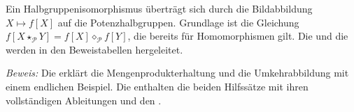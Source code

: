 \par{}
\hypertarget{power-isomorphisms.notation}{}
Ein Halbgruppenisomorphismus überträgt sich durch die Bildabbildung
\(X\mapsto f[X]\) auf die Potenzhalbgruppen. Grundlage ist die Gleichung
\(f[X\star_{\mathcal P}Y]=f[X]\diamond_{\mathcal P}f[Y]\), die bereits
für Homomorphismen gilt. Die
und die
werden in den Beweistabellen hergeleitet.

\setcounter{formulaThm}{3}
\hypertarget{power-isomorphisms.main.isomorphism}{}
\PowerIsoIsomorphismStatement

\noindent\emph{Beweis:} Die \PowerIsoReadingLink{} erklärt die
Mengenprodukterhaltung und die Umkehrabbildung mit einem endlichen Beispiel.
Die \PowerIsoProofsLink{} enthalten die beiden Hilfssätze mit ihren
vollständigen Ableitungen und den
\PowerIsoIsomorphismProofLink{}.

